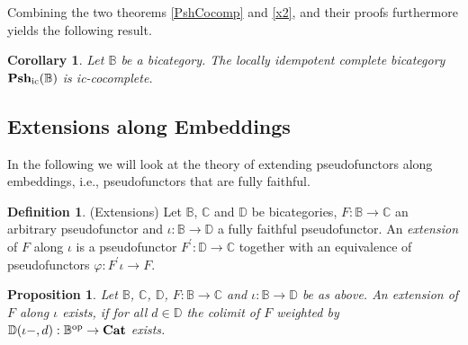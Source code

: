 \documentclass[12pt,oneside,reqno,a4paper]{article}
\newtheorem{corollary}[theorem]{Corollary}
\newtheorem{proposition}[theorem]{Proposition}
\theoremstyle{definition}
\newtheorem{definition}[theorem]{Definition}
\newcommand{\op}{^\textup{op}}
\newcommand{\Cat}{\textbf{\textup{Cat}}}
\newcommand{\Pshic}[1]{\textbf{\textup{Psh}}_\textup{ic}(#1)}
\renewcommand{\phi}{\varphi}
\newcommand{\bB}{\mathbb{B}}
\newcommand{\bC}{\mathbb{C}}
\newcommand{\bD}{\mathbb{D}}
\newcommand{\p}{^\prime}
\begin{document}
Combining the two theorems \ref{PshCocomp} and \ref{x2}, and their proofs furthermore yields the following result.

\begin{corollary} \label{Pshicc}
Let $\bB$ be a bicategory. The locally idempotent complete bicategory $\Pshic{\bB}$ is ic-cocomplete.
\end{corollary}

\subsection{Extensions along Embeddings} \label{app3}

In the following we will look at the theory of extending pseudofunctors along embeddings, i.e., pseudofunctors that are fully faithful.

\begin{definition}{(Extensions)}
Let $\bB$, $\bC$ and $\bD$ be bicategories, $F:\bB\to \bC$ an arbitrary pseudofunctor and $\iota:\bB\to\bD$ a fully faithful pseudofunctor. An \textit{extension} of $F$ along $\iota$ is a pseudofunctor $F\p:\bD\to\bC$ together with an equivalence of pseudofunctors $\phi:F\p\iota\to F$.
\end{definition}

\begin{proposition}\label{ext}
Let $\bB$, $\bC$, $\bD$, $F:\bB\to \bC$  and $\iota:\bB\to\bD$ be as above. An extension of $F$ along $\iota$ exists, if for all $d\in\bD$ the colimit of $F$ weighted by $\bD(\iota-,d):\bB\op\to\Cat$ exists.
\end{proposition}
\end{document}
